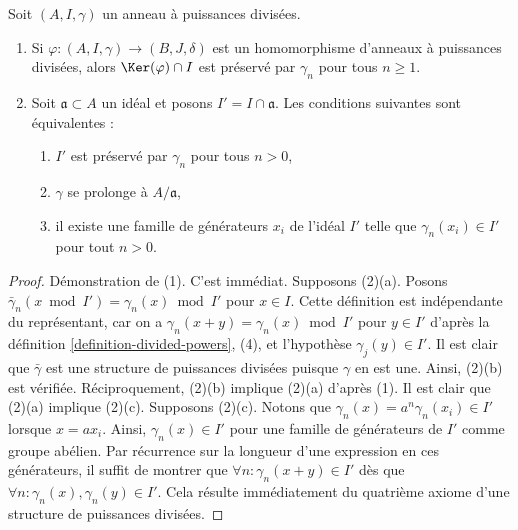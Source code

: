 \begin{lemma}

\label{lemma-kernel}

Soit $(A, I, \gamma)$ un anneau à puissances divisées.

\begin{enumerate}

\item Si $\varphi : (A, I, \gamma) \to (B, J, \delta)$ est un homomorphisme d'anneaux à puissances divisées, alors $\Ker(\varphi) \cap I$
est préservé par $\gamma_n$ pour tous $n \geq 1$.
\item Soit $\mathfrak a \subset A$ un idéal et posons
$I' = I \cap \mathfrak a$. Les conditions suivantes sont équivalentes :

\begin{enumerate}

\item  $I'$ est préservé par $\gamma_n$ pour tous $n > 0$,
\item  $\gamma$ se prolonge à $A/\mathfrak a$,
\item il existe une famille de générateurs $x_i$ de l'idéal $I'$ telle que $\gamma_n(x_i) \in I'$ pour tout $n > 0$.

\end{enumerate}

\end{enumerate}

\end{lemma}

\begin{proof}

Démonstration de (1). C'est immédiat. Supposons (2)(a). Posons
$\bar\gamma_n(x \bmod I') = \gamma_n(x) \bmod I'$ pour $x \in I$. Cette définition est indépendante du représentant, car on a $\gamma_n(x + y) = \gamma_n(x) \bmod I'$
pour $y \in I'$
d'après la définition \ref{definition-divided-powers}, (4), et l'hypothèse $\gamma_j(y) \in I'$. Il est clair que $\bar\gamma$ est une structure de puissances divisées puisque $\gamma$ en est une. Ainsi, (2)(b) est vérifiée. Réciproquement, (2)(b) implique (2)(a) d'après (1). Il est clair que (2)(a) implique (2)(c). Supposons (2)(c). Notons que $\gamma_n(x) = a^n\gamma_n(x_i) \in I'$ lorsque $x = ax_i$. Ainsi, $\gamma_n(x) \in I'$ pour une famille de générateurs de $I'$ comme groupe abélien. Par récurrence sur la longueur d'une expression en ces générateurs, il suffit de montrer que $\forall n : \gamma_n(x + y) \in I'$
dès que $\forall n : \gamma_n(x), \gamma_n(y) \in I'$. Cela résulte immédiatement du quatrième axiome d'une structure de puissances divisées.

\end{proof}

